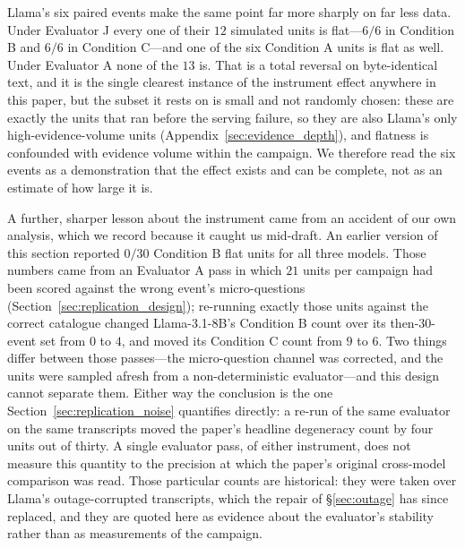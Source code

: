 \documentclass[11pt,journal,onecolumn]{IEEEtran}
\begin{document}
Llama's six paired events make the same point far more sharply on far less data. Under Evaluator J every one of their $12$ simulated units is flat---$6/6$ in Condition B and $6/6$ in Condition C---and one of the six Condition A units is flat as well. Under Evaluator A none of the $13$ is. That is a total reversal on byte-identical text, and it is the single clearest instance of the instrument effect anywhere in this paper, but the subset it rests on is small and not randomly chosen: these are exactly the units that ran before the serving failure, so they are also Llama's only high-evidence-volume units (Appendix~\ref{sec:evidence_depth}), and flatness is confounded with evidence volume within the campaign. We therefore read the six events as a demonstration that the effect exists and can be complete, not as an estimate of how large it is.

A further, sharper lesson about the instrument came from an accident of our own analysis, which we record because it caught us mid-draft. An earlier version of this section reported $0/30$ Condition B flat units for all three models. Those numbers came from an Evaluator A pass in which $21$ units per campaign had been scored against the wrong event's micro-questions (Section~\ref{sec:replication_design}); re-running exactly those units against the correct catalogue changed Llama-3.1-8B's Condition B count over its then-30-event set from $0$ to $4$, and moved its Condition C count from $9$ to $6$. Two things differ between those passes---the micro-question channel was corrected, and the units were sampled afresh from a non-deterministic evaluator---and this design cannot separate them. Either way the conclusion is the one Section~\ref{sec:replication_noise} quantifies directly: a re-run of the same evaluator on the same transcripts moved the paper's headline degeneracy count by four units out of thirty. A single evaluator pass, of either instrument, does not measure this quantity to the precision at which the paper's original cross-model comparison was read. Those particular counts are historical: they were taken over Llama's outage-corrupted transcripts, which the repair of \S\ref{sec:outage} has since replaced, and they are quoted here as evidence about the evaluator's stability rather than as measurements of the campaign.
\end{document}
